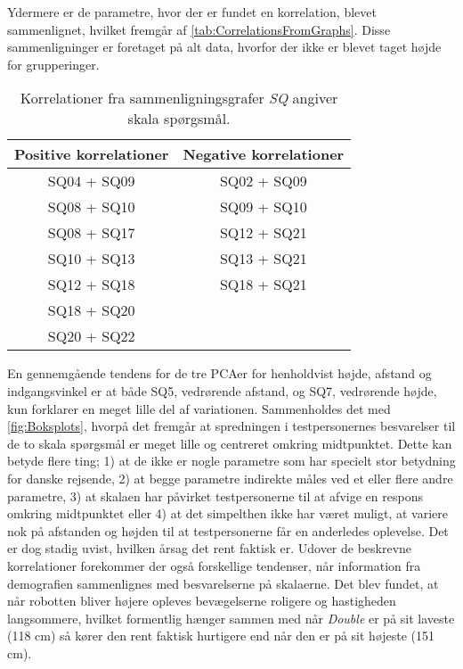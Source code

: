 %
Ydermere er de parametre, hvor der er fundet en korrelation, blevet sammenlignet, hvilket fremgår af \autoref{tab:CorrelationsFromGraphs}. Disse sammenligninger er foretaget på alt data, hvorfor der ikke er blevet taget højde for grupperinger.
%
\begin{table}[H]
	\centering
	\begin{tabular}{ c|c }
		\centering
		Positive korrelationer & Negative korrelationer \\ \hline
		SQ04 + SQ09 & SQ02 + SQ09 \\ 
		SQ08 + SQ10 & SQ09 + SQ10 \\ 
		SQ08 + SQ17 & SQ12 + SQ21 \\ 
		SQ10 + SQ13 & SQ13 + SQ21 \\ 
		SQ12 + SQ18 & SQ18 + SQ21	\\	
		SQ18 + SQ20 & 							\\
		SQ20 + SQ22 & 
	\end{tabular}        
\caption{Korrelationer fra sammenligningsgrafer \textit{SQ} angiver skala spørgsmål.}
\label{tab:CorrelationsFromGraphs} 
\end{table}
\noindent
%
En gennemgående tendens for de tre PCAer for henholdvist højde, afstand og indgangsvinkel er at både SQ5, vedrørende afstand, og SQ7, vedrørende højde, kun forklarer en meget lille del af variationen. Sammenholdes det med \autoref{fig:Boksplots}, hvorpå det fremgår at spredningen i testpersonernes besvarelser til de to skala spørgsmål er meget lille og centreret omkring midtpunktet. Dette kan betyde flere ting; 1) at de ikke er nogle parametre som har specielt stor betydning for danske rejsende, 2) at begge parametre indirekte måles ved et eller flere andre parametre, 3) at skalaen har påvirket testpersonerne til at afvige en respons omkring midtpunktet eller 4) at det simpelthen ikke har været muligt, at variere nok på afstanden og højden til at testpersonerne får en anderledes oplevelse. Det er dog stadig uvist, hvilken årsag det rent faktisk er.\blankline  
%
Udover de beskrevne korrelationer forekommer der også forskellige tendenser, når information fra demografien sammenlignes med besvarelserne på skalaerne. Det blev fundet, at når robotten bliver højere opleves bevægelserne roligere og hastigheden langsommere, hvilket formentlig hænger sammen med når \textit{Double} er på sit laveste (118 cm) så kører den rent faktisk hurtigere end når den er på sit højeste (151 cm). 


